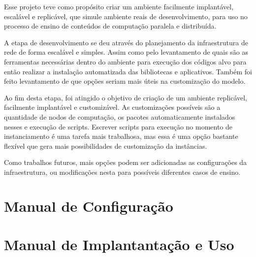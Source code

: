 \documentclass[tg]{mdtufsm}
\begin{document}
Esse projeto teve como propósito criar um ambiente facilmente implantável, escalável e replicável, que simule ambiente reais de desenvolvimento, para uso no processo de ensino de conteúdos de computação paralela e distribuída.

A etapa de desenvolvimento se deu através do planejamento da infraestrutura de rede de forma escalável e simples. Assim como pelo levantamento de quais são as ferramentas necessárias dentro do ambiente para execução dos códigos alvo para então realizar a instalação automatizada das bibliotecas e aplicativos. Também foi feito levantamento de que opções seriam mais úteis na customização do modelo.

Ao fim desta etapa, foi atingido o objetivo de criação de um ambiente replicável, facilmente implantável e customizável. As customizações possíveis são a quantidade de nodos de computação, os pacotes automaticamente instalados nesses e execução de scripts. Escrever scripts para execução no momento de instanciamento é uma tarefa mais trabalhosa, mas essa é uma opção bastante flexível que gera mais possibilidades de customização da instâncias.

Como trabalhos futuros, mais opções podem ser adicionadas as configurações da infraestrutura, ou modificações nesta para possíveis diferentes casos de ensino.


\setlength{\baselineskip}{\baselineskip}



\appendix
\chapter{Manual de Configuração}
\label{appendix:setupManual}


\chapter{Manual de Implantantação e Uso}
\label{appendix:userManual}

\end{document}
